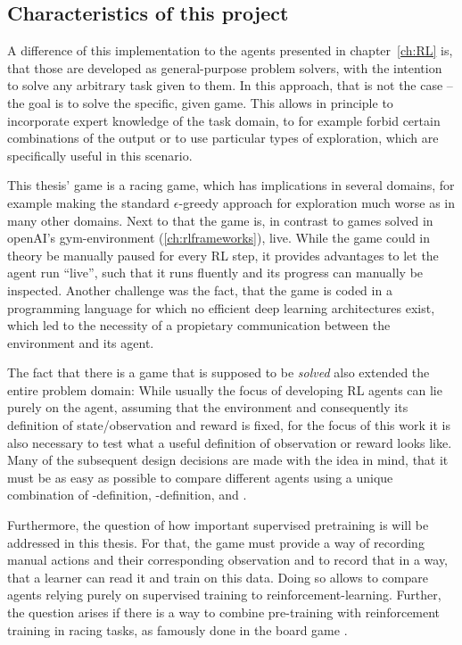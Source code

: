 \subsection{Characteristics of this project} \label{ch:projectcharacteristics}

A difference of this implementation to the agents presented in chapter~\ref{ch:RL} is, that those are developed as general-purpose problem solvers, with the intention to solve any arbitrary task given to them. In this approach, that is not the case -- the goal is to solve the specific, given game. This allows in principle to incorporate expert knowledge of the task domain, to for example forbid certain combinations of the output or to use particular types of exploration, which are specifically useful in this scenario. 

This thesis' game is a racing game, which has implications in several domains, for example making the standard $\epsilon$-greedy approach for exploration much worse as in many other domains. Next to that the game is, in contrast to games solved in openAI's gym-environment (\ref{ch:rlframeworks}), live. While the game could in theory be manually paused for every RL step, it provides advantages to let the agent run ``live'', such that it runs fluently and its progress can manually be inspected. Another challenge was the fact, that the game is coded in a programming language for which no efficient deep learning architectures exist, which led to the necessity of a propietary communication between the environment and its agent.

The fact that there is a game that is supposed to be \textit{solved} also extended the entire problem domain: While usually the focus of developing RL agents can lie purely on the agent, assuming that the environment and consequently its definition of state/observation and reward is fixed, for the focus of this work it is also necessary to test what a useful definition of observation or reward looks like. Many of the subsequent design decisions are made with the idea in mind, that it must be as easy as possible to compare different agents using a unique combination of -definition, -definition,  and . 

Furthermore, the question of how important supervised pretraining is will be addressed in this thesis. For that, the game must provide a way of recording manual actions and their corresponding observation and to record that in a way, that a learner can read it and train on this data. Doing so allows to compare agents relying purely on supervised training to reinforcement-learning. Further, the question arises if there is a way to combine pre-training with reinforcement training in racing tasks, as famously done in the board game \cite{silver_mastering_2016}.

